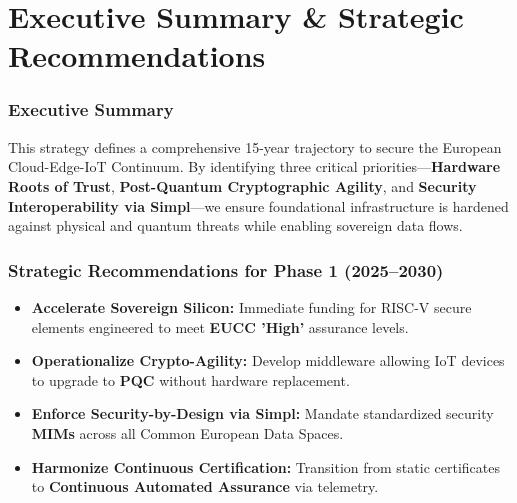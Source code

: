 \documentclass[12pt,a4paper]{report}
\begin{document}
\noindent
{}

\chapter{Executive Summary \& Strategic Recommendations}

\subsection*{Executive Summary}
This strategy defines a comprehensive 15-year trajectory to secure the European Cloud-Edge-IoT Continuum. By identifying three critical priorities—\textbf{Hardware Roots of Trust}, \textbf{Post-Quantum Cryptographic Agility}, and \textbf{Security Interoperability via Simpl}—we ensure foundational infrastructure is hardened against physical and quantum threats while enabling sovereign data flows.

\subsection*{Strategic Recommendations for Phase 1 (2025--2030)}
\begin{itemize}
    \item \textbf{Accelerate Sovereign Silicon:} Immediate funding for RISC-V secure elements engineered to meet \textbf{EUCC 'High'} assurance levels.
    \item \textbf{Operationalize Crypto-Agility:} Develop middleware allowing IoT devices to upgrade to \textbf{PQC} without hardware replacement.
    \item \textbf{Enforce Security-by-Design via Simpl:} Mandate standardized security \textbf{MIMs} across all Common European Data Spaces.
    \item \textbf{Harmonize Continuous Certification:} Transition from static certificates to \textbf{Continuous Automated Assurance} via telemetry.
\end{itemize}
\end{document}
